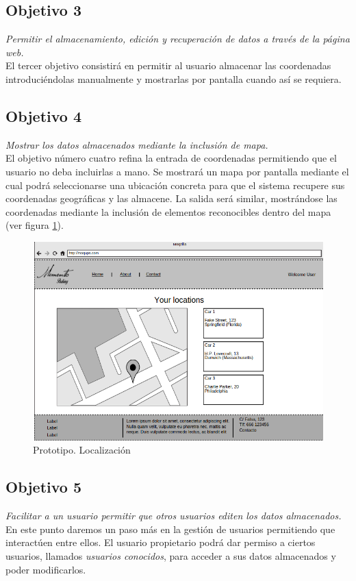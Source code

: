 \subsection{Objetivo 3}
\emph{Permitir el almacenamiento, edición y recuperación de datos a través de la página web.}\\
El tercer objetivo consistirá en permitir al usuario almacenar las coordenadas introduciéndolas manualmente y mostrarlas por pantalla cuando así se requiera.

\subsection{Objetivo 4}
\emph{Mostrar los datos almacenados mediante la inclusión de mapa.}\\
El objetivo número cuatro refina la entrada de coordenadas permitiendo que el usuario no deba incluirlas a mano. Se mostrará un mapa por pantalla mediante el cual podrá seleccionarse una ubicación concreta para que el sistema recupere sus coordenadas geográficas y las almacene. La salida será similar, mostrándose las coordenadas mediante la inclusión de elementos reconocibles dentro del mapa (ver figura \ref{fig:prototipo_locations}).

\begin{figure}[h!btp]
	\centering
	\includegraphics[scale=0.5, fbox={\fboxrule} 4mm]{images/02-objetivos/04-prototipo_locations.png}
	\caption{Prototipo. Localización}
	\label{fig:prototipo_locations}
\end{figure}


\subsection{Objetivo 5}
\emph{Facilitar a un usuario permitir que otros usuarios editen los datos almacenados.}\\
En este punto daremos un paso más en la gestión de usuarios permitiendo que interactúen entre ellos. El usuario propietario podrá dar permiso a ciertos usuarios, llamados \textit{usuarios conocidos}, para acceder a sus datos almacenados y poder modificarlos.

